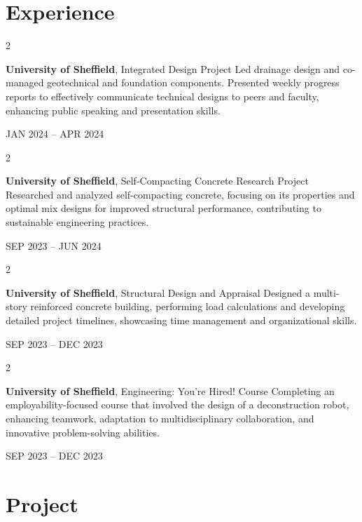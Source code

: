 \documentclass[10pt, letterpaper]{article}
\newenvironment{twocolentry}[2][]{
\onecolentry
\def\secondColumn{#2}
\setcolumnwidth{\fill, 4.5 cm}
\begin{paracol}{2}
}{
\switchcolumn \raggedleft \secondColumn
\end{paracol}
\endonecolentry
} %
\begin{document}
\medskip

\section{Experience}

\begin{twocolentry}{

JAN 2024 – APR 2024
}
\textbf{University of Sheffield}, Integrated Design Project
Led drainage design and co-managed geotechnical and foundation components. Presented weekly progress reports to effectively communicate technical designs to peers and faculty, enhancing public speaking and presentation skills.

\end{twocolentry}
\vspace{0.2 cm}

\begin{twocolentry}{

SEP 2023 – JUN 2024
}
\textbf{University of Sheffield}, Self-Compacting Concrete Research Project
Researched and analyzed self-compacting concrete, focusing on its properties and optimal mix designs for improved structural performance, contributing to sustainable engineering practices.

\end{twocolentry}
\vspace{0.2 cm}

\begin{twocolentry}{

SEP 2023 – DEC 2023
}
\textbf{University of Sheffield}, Structural Design and Appraisal
Designed a multi-story reinforced concrete building, performing load calculations and developing detailed project timelines, showcasing time management and organizational skills.

\end{twocolentry}
\vspace{0.2 cm}

\begin{twocolentry}{

SEP 2023 – DEC 2023
}
\textbf{University of Sheffield}, Engineering: You're Hired! Course
Completing an employability-focused course that involved the design of a deconstruction robot, enhancing teamwork, adaptation to multidisciplinary collaboration, and innovative problem-solving abilities.

\end{twocolentry}
\medskip

\section{Project}
\end{document}
